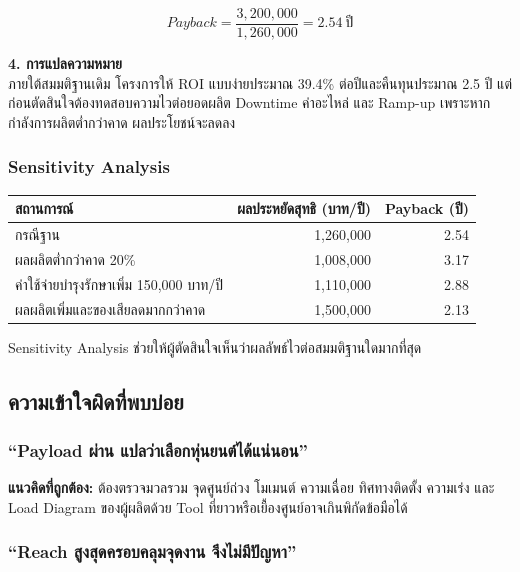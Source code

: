 \[
Payback=\frac{3{,}200{,}000}{1{,}260{,}000}=2.54\ \text{ปี}
\]

\textbf{4. การแปลความหมาย}\\
ภายใต้สมมติฐานเดิม โครงการให้ ROI แบบง่ายประมาณ 39.4\% ต่อปีและคืนทุนประมาณ 2.5 ปี แต่ก่อนตัดสินใจต้องทดสอบความไวต่อยอดผลิต Downtime ค่าอะไหล่ และ Ramp-up เพราะหากกำลังการผลิตต่ำกว่าคาด ผลประโยชน์จะลดลง

\subsubsection{Sensitivity Analysis}

\begin{table}[htbp]
    \centering
    \begin{tabular}{l r r}
        \hline
        \textbf{สถานการณ์} & \textbf{ผลประหยัดสุทธิ (บาท/ปี)} & \textbf{Payback (ปี)} \\
        \hline
        กรณีฐาน & 1,260,000 & 2.54 \\
        ผลผลิตต่ำกว่าคาด 20\% & 1,008,000 & 3.17 \\
        ค่าใช้จ่ายบำรุงรักษาเพิ่ม 150,000 บาท/ปี & 1,110,000 & 2.88 \\
        ผลผลิตเพิ่มและของเสียลดมากกว่าคาด & 1,500,000 & 2.13 \\
        \hline
    \end{tabular}
\end{table}

Sensitivity Analysis ช่วยให้ผู้ตัดสินใจเห็นว่าผลลัพธ์ไวต่อสมมติฐานใดมากที่สุด


\subsection{ความเข้าใจผิดที่พบบ่อย}

\subsubsection{“Payload ผ่าน แปลว่าเลือกหุ่นยนต์ได้แน่นอน”}

\textbf{แนวคิดที่ถูกต้อง:} ต้องตรวจมวลรวม จุดศูนย์ถ่วง โมเมนต์ ความเฉื่อย ทิศทางติดตั้ง ความเร่ง และ Load Diagram ของผู้ผลิตด้วย Tool ที่ยาวหรือเยื้องศูนย์อาจเกินพิกัดข้อมือได้

\subsubsection{“Reach สูงสุดครอบคลุมจุดงาน จึงไม่มีปัญหา”}

